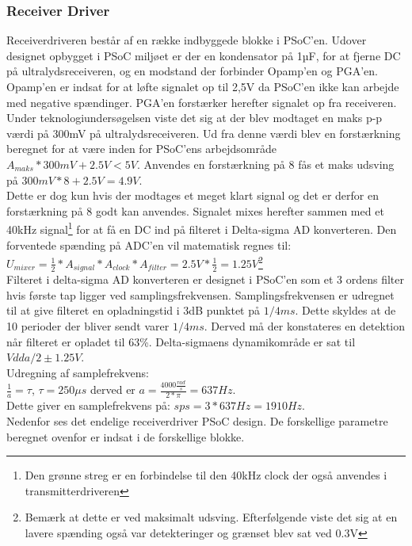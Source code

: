 \subsubsection{Receiver Driver}
Receiverdriveren består af en række indbyggede blokke i PSoC'en. Udover designet opbygget i PSoC miljøet er der en kondensator på 1µF, for at fjerne DC på ultralydsreceiveren, og en modstand der forbinder Opamp'en og PGA'en. Opamp'en er indsat for at løfte signalet op til 2,5V da PSoC'en ikke kan arbejde med negative spændinger. PGA'en forstærker herefter signalet op fra receiveren. Under teknologiundersøgelsen viste det sig at der blev modtaget en maks p-p værdi på 300mV på ultralydsreceiveren. Ud fra denne værdi blev en forstærkning beregnet for at være inden for PSoC'ens arbejdsområde\\
$A_{maks}*300mV+2.5V < 5V$. Anvendes en forstærkning på 8 fås et maks udsving på $300mV*8+2.5V=4.9V$.\\
Dette er dog kun hvis der modtages et meget klart signal og det er derfor en forstærkning på 8 godt kan anvendes. Signalet mixes  herefter sammen med et 40kHz signal\footnote{Den grønne streg er en forbindelse til den 40kHz clock der også anvendes i transmitterdriveren} for at få en DC ind på filteret i Delta-sigma AD konverteren. Den forventede spænding på ADC'en vil matematisk regnes til:\\
$U_{mixer}=\frac{1}{2}*A_{signal}*A_{clock}*A_{filter}=2.5V*\frac{1}{2}=1.25V$\footnote{Bemærk at dette er ved maksimalt udsving. Efterfølgende viste det sig at en lavere spænding også var detekteringer og grænset blev sat ved 0.3V}\\
Filteret i delta-sigma AD konverteren er designet i PSoC'en som et 3 ordens filter hvis første tap ligger ved samplingsfrekvensen. Samplingsfrekvensen er udregnet til at give filteret en opladningstid i 3dB punktet på $1/4ms$. Dette skyldes at de 10 perioder der bliver sendt varer $1/4ms$. Derved må der konstateres en detektion når filteret er opladet til 63\%. Delta-sigmaens dynamikområde er sat til $Vdda/2\pm1.25V$.\\
Udregning af samplefrekvens:\\
$\frac{1}{a}=\tau$, $\tau=250\mu s$ derved er $a=\frac{4000\frac{rad}{s}}{2*\pi}=637\si{Hz}$. \\
Dette giver en samplefrekvens på: $sps=3*637\si{Hz}=1910\si{Hz}$.\\
Nedenfor ses det endelige receiverdriver PSoC design. De forskellige parametre beregnet ovenfor er indsat i de forskellige blokke.
